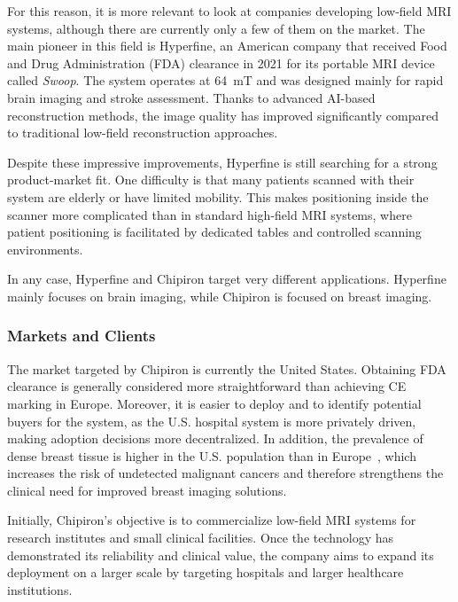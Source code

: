 \documentclass[12pt]{article}
\begin{document}
For this reason, it is more relevant to look at companies developing low-field MRI systems, although there are currently only a few of them on the market.
The main pioneer in this field is Hyperfine, an American company that received Food and Drug Administration (FDA) clearance in 2021 for its portable MRI device called \textit{Swoop}.
The system operates at 64~mT and was designed mainly for rapid brain imaging and stroke assessment.
Thanks to advanced AI-based reconstruction methods, the image quality has improved significantly compared to traditional low-field reconstruction approaches.

Despite these impressive improvements, Hyperfine is still searching for a strong product-market fit. 
One difficulty is that many patients scanned with their system are elderly or have limited mobility.
This makes positioning inside the scanner more complicated than in standard high-field MRI systems, where patient positioning is facilitated by dedicated tables and controlled scanning environments.

In any case, Hyperfine and Chipiron target very different applications. 
Hyperfine mainly focuses on brain imaging, while Chipiron is focused on breast imaging.



\subsubsection{Markets and Clients}

The market targeted by Chipiron is currently the United States. 
Obtaining FDA clearance is generally considered more straightforward than achieving CE marking in Europe. 
Moreover, it is easier to deploy and to identify potential buyers for the system, as the U.S. hospital system is more privately driven, making adoption decisions more decentralized.
In addition, the prevalence of dense breast tissue is higher in the U.S. population than in Europe~\cite{densebreast}, which increases the risk of undetected malignant cancers and therefore strengthens the clinical need for improved breast imaging solutions.
\vspace{0.5cm}

Initially, Chipiron's objective is to commercialize low-field MRI systems for research institutes and small clinical facilities. 
Once the technology has demonstrated its reliability and clinical value, the company aims to expand its deployment on a larger scale by targeting hospitals and larger healthcare institutions.
\end{document}
